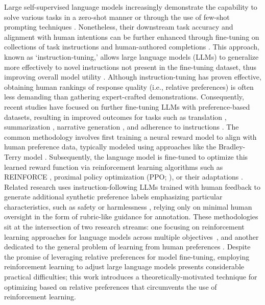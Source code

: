 Large self-supervised language models increasingly demonstrate the capability to solve various tasks in a zero-shot manner \citep{radford2019language} or through the use of few-shot prompting techniques \citep{gpt3,megatron,chowdhery2022palm}. Nonetheless, their downstream task accuracy and alignment with human intentions can be further enhanced through fine-tuning on collections of task instructions and human-authored completions \citep{mishra-etal-2022-cross,sanh2022multitask,chung2022scaling,thoppilan2022lamda}. This approach, known as `instruction-tuning,' allows large language models (LLMs) to generalize more effectively to novel instructions not present in the fine-tuning dataset, thus improving overall model utility \citep{chung2022scaling}. Although instruction-tuning has proven effective, obtaining human rankings of response quality (i.e., relative preferences) is often less demanding than gathering expert-crafted demonstrations. Consequently, recent studies have focused on further fine-tuning LLMs with preference-based datasets, resulting in improved outcomes for tasks such as translation \citep{kreutzer-etal-2018-reliability}, summarization \citep{stiennon2022learning,ziegler2020finetuning}, narrative generation \citep{ziegler2020finetuning}, and adherence to instructions \citep{ouyang2022training,ramamurthy2023is}. The common methodology involves first training a neural reward model to align with human preference data, typically modeled using approaches like the Bradley-Terry model \citep{bradley1952rankanalysis}. Subsequently, the language model is fine-tuned to optimize this learned reward function via reinforcement learning algorithms such as REINFORCE \citep{williams1992reinforce}, proximal policy optimization (PPO; \cite{schulman2017proximal}), or their adaptations \citep{ramamurthy2023is}. Related research uses instruction-following LLMs trained with human feedback to generate additional synthetic preference labels emphasizing particular characteristics, such as safety or harmlessness \citep{bai2022constitutional}, relying only on minimal human oversight in the form of rubric-like guidance for annotation. These methodologies sit at the intersection of two research streams: one focusing on reinforcement learning approaches for language models across multiple objectives~\citep{Ranzato2015SequenceLT,paulus2018a,wu2018learning}, and another dedicated to the general problem of learning from human preferences \citep{christiano2017deep,kupcsik2018learning}. Despite the promise of leveraging relative preferences for model fine-tuning, employing reinforcement learning to adjust large language models presents considerable practical difficulties; this work introduces a theoretically-motivated technique for optimizing based on relative preferences that circumvents the use of reinforcement learning.

